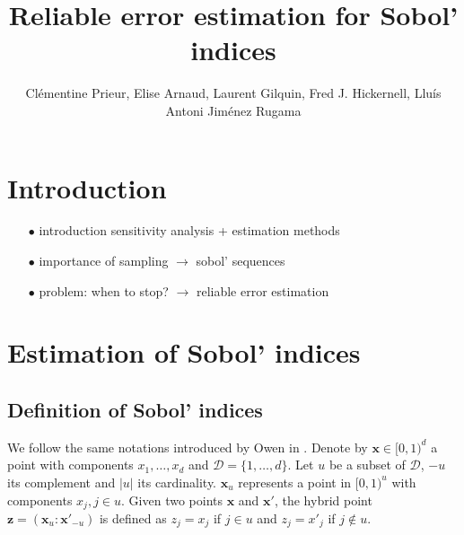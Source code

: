 \documentclass[]{elsarticle}
\theoremstyle{definition}
\newcommand{\bvec}[1]{\boldsymbol{#1}}
\newcommand{\vx}{\bvec{x}}
\newcommand{\vz}{\bvec{z}}
\begin{document}
\begin{frontmatter}

\title{Reliable error estimation for Sobol' indices}

\author{Cl\'ementine Prieur, Elise Arnaud, Laurent Gilquin, Fred J. Hickernell, Llu\'{i}s Antoni Jim\'{e}nez Rugama}
\address{U. Josef Fourier, Illinois Institute of Technology}
\begin{abstract}
\end{abstract}

\end{frontmatter}

\section{Introduction}

\begin{itemize}
\item[$\bullet$] introduction sensitivity analysis + estimation methods
\item[$\bullet$] importance of sampling $\rightarrow$ sobol' sequences
\item[$\bullet$] problem: when to stop? $\rightarrow$ reliable error estimation 
\end{itemize}

\section{Estimation of Sobol' indices}
\subsection{Definition of Sobol' indices}
We follow the same notations introduced by Owen in \cite{Owen}.
Denote by $\vx \in [0,1)^d$ a point with components $x_1,\dots,x_d$ and $\mathcal{D}=\{1,\dots,d\}$. Let $u$ be a subset of $\mathcal{D}$, $-u$ its complement and $|u|$ its cardinality. $\vx_u$ represents a point in $[0,1)^u$ with components $x_j, j \in u$. Given two points $\vx$ and $\vx'$, the hybrid point $\vz=(\vx_u:{\vx'}_{-u})$ is defined as $z_j=x_j$ if $j \in u$ and $z_j={x'}_j$ if $j \notin u$.
\end{document}
